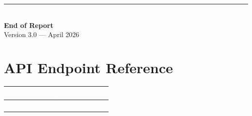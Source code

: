 \documentclass[12pt,a4paper,twoside]{report}
\begin{document}
\begin{center}
\rule{0.5\linewidth}{0.4pt}\\[0.5cm]
{\large\color{darkblue}\textbf{End of Report}}\\[0.3cm]
{\small Version 3.0 — April 2026}
\end{center}

\appendix

\chapter{API Endpoint Reference}

\begin{longtable}{|l|l|l|}
\hline
\rowcolor{tabheader}
\textcolor{white}{\textbf{Method}} &
\textcolor{white}{\textbf{Endpoint}} &
\textcolor{white}{\textbf{Module}} \\
\hline
\endfirsthead
\hline
\rowcolor{tabheader}
\textcolor{white}{\textbf{Method}} &
\textcolor{white}{\textbf{Endpoint}} &
\textcolor{white}{\textbf{Module}} \\
\hline
\endhead


\end{longtable}
\end{document}
